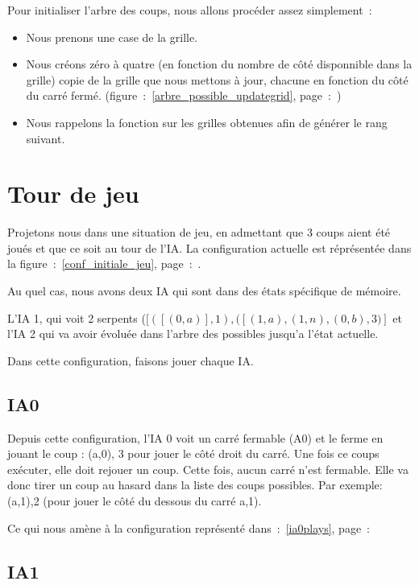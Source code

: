 \documentclass[a4paper,12pt]{report}
\begin{document}
Pour initialiser l'arbre des coups, nous allons proc\'eder assez simplement~:
\begin{itemize}
 \item Nous prenons une case de la grille.
 \item Nous cr\'eons z\'ero \`a quatre (en fonction du nombre de c\^ot\'e disponnible dans la grille) \og{}copie\fg{} de la grille que nous mettons \`a jour, chacune en fonction du c\^ot\'e du carr\'e ferm\'e. (figure~:~\autoref{arbre_possible_updategrid}, page~:~\pageref{arbre_possible_updategrid})
 \item Nous rappelons la fonction sur les grilles obtenues afin de g\'en\'erer le rang suivant. 
\end{itemize}

\chapter{Tour de jeu}

Projetons nous dans une situation de jeu, en admettant que 3 coups aient \'et\'e jou\'es et que ce soit au tour de l'IA. La configuration actuelle est r\'epr\'esent\'ee dans la figure~:~\autoref{conf_initiale_jeu}, page~:~\pageref{conf_initiale_jeu}.

Au quel cas, nous avons deux IA qui sont dans des \'etats sp\'ecifique de m\'emoire. 

L'IA 1, qui voit 2 serpents ($[([(0,a)],1),([(1,a),(1,n),(0,b), 3)]$ et l'IA 2 qui va avoir \'evolu\'ee dans l'arbre des possibles jusqu'a l'\'etat actuelle. 

Dans cette configuration, faisons jouer chaque IA. 

\section{IA0}

Depuis cette configuration, l'IA 0 voit un carr\'e fermable (A0) et le ferme en jouant le coup : (a,0), 3 pour jouer le c\^ot\'e droit du carr\'e. Une fois ce coups ex\'ecuter, elle doit rejouer un coup. Cette fois, aucun carr\'e n'est fermable. Elle va donc tirer un coup au hasard dans la liste des coups possibles. Par exemple: (a,1),2 (pour jouer le c\^ot\'e du dessous du carr\'e a,1).

Ce qui nous am\`ene \`a la configuration repr\'esent\'e dans~:~\autoref{ia0plays}, page~:~\pageref{ia0plays}

\section{IA1}
\end{document}
